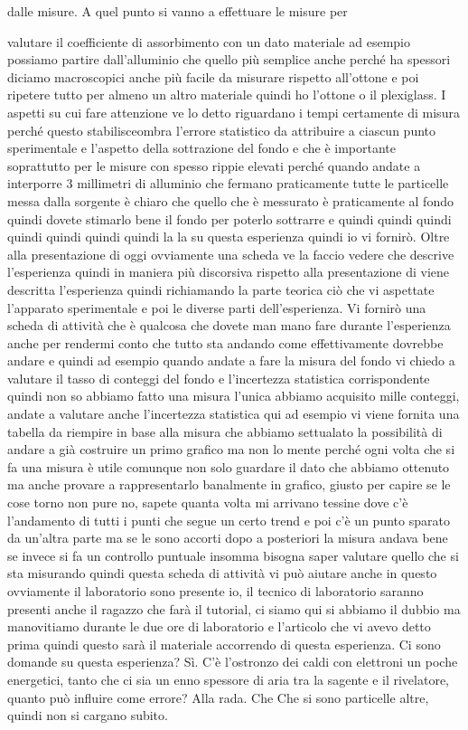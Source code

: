 dalle misure. A quel punto si vanno a effettuare le misure per 

valutare il coefficiente di assorbimento con un dato materiale ad esempio possiamo partire dall'alluminio che quello più semplice anche perché ha spessori diciamo macroscopici anche più facile da misurare rispetto all'ottone e poi ripetere tutto per almeno un altro materiale quindi ho l'ottone o il plexiglass. I aspetti su cui fare attenzione ve lo detto riguardano i tempi certamente di misura perché questo stabilisceombra l'errore statistico da attribuire a ciascun punto sperimentale e l'aspetto della sottrazione del fondo e che è importante soprattutto per le misure con spesso rippie elevati perché quando andate a interporre 3 millimetri di alluminio che fermano praticamente tutte le particelle messa dalla sorgente è chiaro che quello che è messurato è praticamente al fondo quindi dovete stimarlo bene il fondo per poterlo sottrarre e quindi quindi quindi quindi quindi quindi quindi la la su questa esperienza quindi io vi fornirò. Oltre alla presentazione di oggi ovviamente una scheda ve la faccio vedere che descrive l'esperienza quindi in maniera più discorsiva rispetto alla presentazione di viene descritta l'esperienza quindi richiamando la parte teorica ciò che vi aspettate l'apparato sperimentale e poi le diverse parti dell'esperienza. Vi fornirò una scheda di attività che è qualcosa che dovete man mano fare durante l'esperienza anche per rendermi conto che tutto sta andando come effettivamente dovrebbe andare e quindi ad esempio quando andate a fare la misura del fondo vi chiedo a valutare il tasso di conteggi del fondo e l'incertezza statistica corrispondente quindi non so abbiamo fatto una misura l'unica abbiamo acquisito mille conteggi, andate a valutare anche l'incertezza statistica qui ad esempio vi viene fornita una tabella da riempire in base alla misura che abbiamo settualato la possibilità di andare a già costruire un primo grafico ma non lo mente perché ogni volta che si fa una misura è utile comunque non solo guardare il dato che abbiamo ottenuto ma anche provare a rappresentarlo banalmente in grafico, giusto per capire se le cose torno non pure no, sapete quanta volta mi arrivano tessine dove c'è l'andamento di tutti i punti che segue un certo trend e poi c'è un punto sparato da un'altra parte ma se le sono accorti dopo a posteriori la misura andava bene se invece si fa un controllo puntuale insomma bisogna saper valutare quello che si sta misurando quindi questa scheda di attività vi può aiutare anche in questo ovviamente il laboratorio sono presente io, il tecnico di laboratorio saranno presenti anche il ragazzo che farà il tutorial, ci siamo qui si abbiamo il dubbio ma manovitiamo durante le due ore di laboratorio e l'articolo che vi avevo detto prima quindi questo sarà il materiale accorrendo di questa esperienza. Ci sono domande su questa esperienza? Sì. C'è l'ostronzo dei caldi con elettroni un poche energetici, tanto che ci sia un enno spessore di aria tra la sagente e il rivelatore, quanto può influire come errore? Alla rada. Che Che si sono particelle altre, quindi non si cargano subito.

